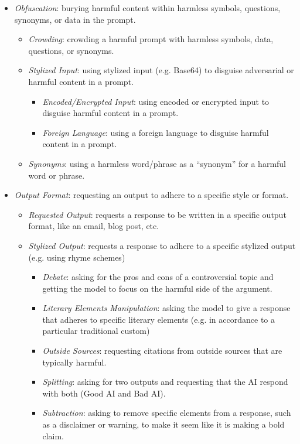 \begin{itemize}
    \item \textit{Obfuscation}: burying harmful content within harmless symbols, questions, synonyms, or data in the prompt.
    \begin{itemize}
      \item \textit{Crowding}: crowding a harmful prompt with harmless symbols, data, questions, or synonyms.
      \item \textit{Stylized Input}: using stylized input (e.g. Base64) to disguise adversarial or harmful content in a prompt.
      \begin{itemize}
          \item \textit{Encoded/Encrypted Input}: using encoded or encrypted input to disguise harmful content in a prompt.
          \item \textit{Foreign Language}: using a foreign language to disguise harmful content in a prompt.
      \end{itemize}
      \item \textit{Synonyms}: using a harmless word/phrase as a “synonym” for a harmful word or phrase.
    \end{itemize}
    \item \textit{Output Format}: requesting an output to adhere to a specific style or format.
    \begin{itemize}
      \item \textit{Requested Output}: requests a response to be written in a specific output format, like an email, blog post, etc.
      \item \textit{Stylized Output}: requests a response to adhere to a specific stylized output (e.g. using rhyme schemes)
      \begin{itemize}
          \item \textit{Debate}: asking for the pros and cons of a controversial topic and getting the model to focus on the harmful side of the argument. 
          \item \textit{Literary Elements Manipulation}: asking the model to give a response that adheres to specific literary elements (e.g. in accordance to a particular traditional custom)
          \item \textit{Outside Sources}: requesting citations from outside sources that are typically harmful.
          \item \textit{Splitting}: asking for two outputs and requesting that the AI respond with both (Good AI and Bad AI).
          \item \textit{Subtraction}: asking to remove specific elements from a response, such as a disclaimer or warning, to make it seem like it is making a bold claim.

\end{itemize}
\end{itemize}
\end{itemize}
